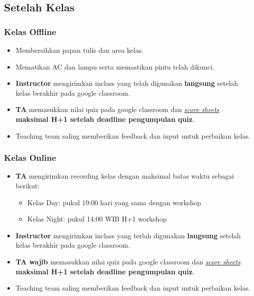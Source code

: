 \documentclass[
]{book}
\providecommand{\tightlist}{%
  \setlength{\itemsep}{0pt}\setlength{\parskip}{0pt}}
\begin{document}
\hypertarget{setelah-kelas}{%
\subsection{Setelah Kelas}\label{setelah-kelas}}

\hypertarget{kelas-offline-2}{%
\subsubsection{Kelas Offline}\label{kelas-offline-2}}

\begin{itemize}
\tightlist
\item
  Membersihkan papan tulis dan area kelas.
\item
  Mematikan AC dan lampu serta memastikan pintu telah dikunci.
\item
  \textbf{Instructor} mengirimkan inclass yang telah digunakan \textbf{langsung} setelah kelas berakhir pada google classroom.
\item
  \textbf{TA} memasukkan nilai quiz pada google classroom dan \href{https://docs.google.com/spreadsheets/d/1cGJ0pn9k9gKCBnceWVwaL9D7BBDMNjLh8uPYlaBlJi8/edit?usp=sharing}{\emph{score sheets}} \textbf{maksimal H+1 setelah deadline pengumpulan quiz}.
\item
  Teaching team saling memberikan feedback dan input untuk perbaikan kelas.
\end{itemize}

\hypertarget{kelas-online-2}{%
\subsubsection{Kelas Online}\label{kelas-online-2}}

\begin{itemize}
\item
  \textbf{TA} mengirimkan recording kelas dengan maksimal batas waktu sebagai berikut:

  \begin{itemize}
  \tightlist
  \item
    Kelas Day: pukul 19:00 hari yang sama dengan workshop
  \item
    Kelas Night: pukul 14:00 WIB H+1 workshop
  \end{itemize}
\item
  \textbf{Instructor} mengirimkan inclass yang terlah digunakan \textbf{langsung} setelah kelas berakhir pada google classroom.
\item
  \textbf{TA wajib} memasukkan nilai quiz pada google classroom dan \href{https://docs.google.com/spreadsheets/d/1cGJ0pn9k9gKCBnceWVwaL9D7BBDMNjLh8uPYlaBlJi8/edit?usp=sharing}{\emph{score sheets}} \textbf{maksimal H+1 setelah deadline pengumpulan quiz}.
\item
  Teaching team saling memberikan feedback dan input untuk perbaikan kelas.
\end{itemize}
\end{document}
